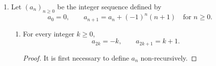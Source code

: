 \begin{enumerate}
\begin{enumerate}
\begin{proof}
                    \smallskip

                    A similar method is used to prove the equivalent statement for $h$. Assume that $C \neq \varnothing$, and consider the values of $h(\varnothing)$ and $h(C)$.
                    Since $C \supset \varnothing$, we have
                    \[ h(\varnothing) = \varnothing \cup C = C, \]
                    and
                    \[ h(C) = C \cup C = C. \]
                    Hence $h(\varnothing) = h(C)$, which again contradicts the requirement for injectivity.
                \end{proof}

        \end{enumerate}

        \bigskip

        \setcounter{enumi}{3}

    \item Let $(a_n)_{n \ge 0}$ be the integer sequence defined by
        \[
            a_0 = 0, \qquad a_{n + 1} = a_n + (-1)^n (n + 1) \quad \text{for $n \ge 0$.}
        \]

        \bigskip

        \begin{enumerate}

            \item
                \begin{proposition} \label{prop:4a}
                    For every integer $k \ge 0$,
                    \[ a_{2k} = -k, \qquad a_{2k + 1} = k + 1. \]
                \end{proposition}

                \medskip

                \begin{proof}
                    It is first necessary to define $a_n$ non-recursively.

                    \smallskip


\end{proof}
\end{enumerate}
\end{enumerate}
